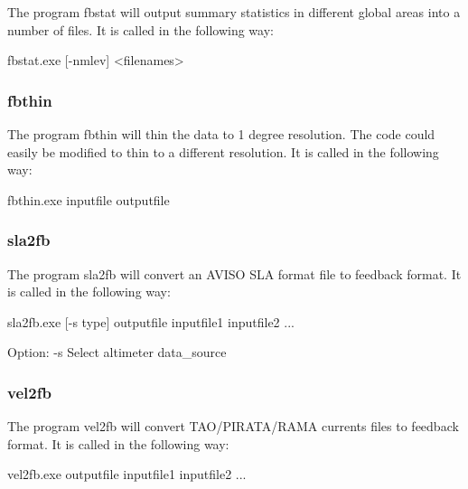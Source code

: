 \documentclass[../main/NEMO_manual]{subfiles}
\begin{document}
The program fbstat will output summary statistics in different global areas into a number of files.
It is called in the following way:

\begin{cmds}
fbstat.exe [-nmlev] <filenames>
\end{cmds}

\subsubsection{fbthin}

The program fbthin will thin the data to 1 degree resolution.
The code could easily be modified to thin to a different resolution.
It is called in the following way:

\begin{cmds}
fbthin.exe inputfile outputfile
\end{cmds}

\subsubsection{sla2fb}

The program sla2fb will convert an AVISO SLA format file to feedback format.
It is called in the following way:

\begin{cmds}
sla2fb.exe [-s type] outputfile inputfile1 inputfile2 ...

Option:
     -s            Select altimeter data_source
\end{cmds}

\subsubsection{vel2fb}

The program vel2fb will convert TAO/PIRATA/RAMA currents files to feedback format.
It is called in the following way:

\begin{cmds}
vel2fb.exe outputfile inputfile1 inputfile2 ...
\end{cmds}

\end{document}
